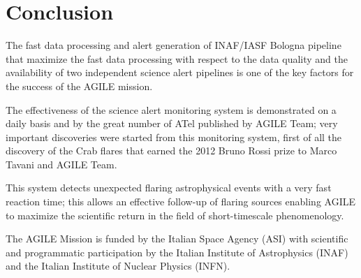 \section{Conclusion}

The fast data processing and alert generation of INAF/IASF
      Bologna pipeline that maximize the fast data processing with
      respect to the data quality and the availability of two
      independent science alert pipelines is one of the key factors for
      the success of the AGILE mission.
    
    The effectiveness of the science alert monitoring system is demonstrated on a daily basis and by the great number of ATel published by AGILE Team; very important discoveries were started from this
      monitoring system, first of all the discovery of the Crab flares
      that earned the 2012 Bruno Rossi prize to Marco Tavani and AGILE
      Team.
      
        This system detects unexpected flaring astrophysical events
          with a very fast reaction time; this allows an effective
          follow-up of flaring sources enabling AGILE to maximize the
          scientific return in the field of short-timescale
          phenomenology.

\acknowledgements The AGILE Mission is funded by the Italian Space Agency (ASI) with 
scientific and programmatic participation by the Italian Institute 
of Astrophysics (INAF) and the Italian Institute of Nuclear 
Physics (INFN). 



